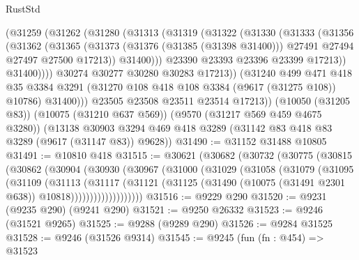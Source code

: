 \begin{lexlean}{RustStd}
\begin{coremodule}
              (@31259
                (@31262
                  (@31280
                    (@31313
                      (@31319
                        (@31322
                          (@31330
                            (@31333
                              (@31356
                                (@31362
                                  (@31365
                                    (@31373
                                      (@31376 (@31385 (@31398 @31400)))
                                      @27491
                                      @27494
                                      @27497
                                      @27500
                                      @17213))
                                  @31400)))
                            @23390
                            @23393
                            @23396
                            @23399
                            @17213))
                        @31400))))
                @30274
                @30277
                @30280
                @30283
                @17213))
            (@31240
              @499
              @471
              @418
              @35
              @3384
              @3291
              (@31270 @108 @418 @108 @3384 (@9617 (@31275 @108)) @10786)
              @31400)))
        @23505
        @23508
        @23511
        @23514
        @17213))
    (@10050 (@31205 @83))
    (@10075 (@31210 @637 @569))
    (@9570 (@31217 @569 @459 @4675 @3280))
    (@13138 @30903 @3294 @469 @418 @3289 (@31142 @83 @418 @83 @3289 (@9617 (@31147 @83)) @9628))
@31490 := @31152 @31488 @10805
@31491 := @10810 @418
@31515 := @30621
    (@30682
      (@30732
        (@30775
          (@30815
            (@30862
              (@30904
                (@30930
                  (@30967
                    (@31000
                      (@31029
                        (@31058
                          (@31079
                            (@31095
                              (@31109
                                (@31113
                                  (@31117
                                    (@31121
                                      (@31125
                                        (@31490
                                          (@10075 (@31491 @2301 @638))
                                          @10818)))))))))))))))))))
@31516 := @9229 @290
@31520 := @9231 (@9235 @290) (@9241 @290)
@31521 := @9250 @26332
@31523 := @9246 (@31521 @9265)
@31525 := @9288 (@9289 @290)
@31526 := @9284 @31525
@31528 := @9246 (@31526 @9314)
@31545 := @9245
    (fun (fn : @454) =>
    @31523

\end{coremodule}
\end{lexlean}
